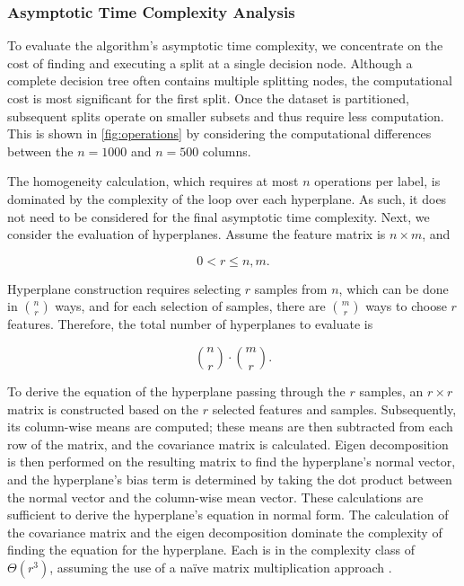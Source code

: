 \documentclass[10pt]{article} %
\begin{document}
\subsubsection{Asymptotic Time Complexity Analysis}\label{analysis}

To evaluate the algorithm's asymptotic time complexity, we concentrate on the cost of finding and executing a split at a single decision node. Although a complete decision tree often contains multiple splitting nodes, the computational cost is most significant for the first split. Once the dataset is partitioned, subsequent splits operate on smaller subsets and thus require less computation. This is shown in \autoref{fig:operations} by considering the computational differences between the $n=1000$ and $n=500$ columns.

The homogeneity calculation, which requires at most \( n \) operations per label, is dominated by the complexity of the loop over each hyperplane. As such, it does not need to be considered for the final asymptotic time complexity. Next, we consider the evaluation of hyperplanes. Assume the feature matrix is \( n \times m \), and 

\begin{equation*}
	0 < r \leq n, m. 
\end{equation*}

Hyperplane construction requires selecting \( r \) samples from \( n \), which can be done in \( \binom{n}{r} \) ways, and for each selection of samples, there are \( \binom{m}{r} \) ways to choose \( r \) features. Therefore, the total number of hyperplanes to evaluate is

\[
	\binom{n}{r} \cdot\binom{m}{r}.
\]

To derive the equation of the hyperplane passing through the \(r\) samples, an \( r \times r \) matrix is constructed based on the $r$ selected features and samples. Subsequently, its column-wise means are computed; these means are then subtracted from each row of the matrix, and the covariance matrix is calculated. Eigen decomposition is then performed on the resulting matrix to find the hyperplane's normal vector, and the hyperplane's bias term is determined by taking the dot product between the normal vector and the column-wise mean vector. These calculations are sufficient to derive the hyperplane's equation in normal form. The calculation of the covariance matrix and the eigen decomposition dominate the complexity of finding the equation for the hyperplane. Each is in the complexity class of \( \Theta(r^3) \), assuming the use of a naïve matrix multiplication approach \citep{matrix}.
\end{document}
